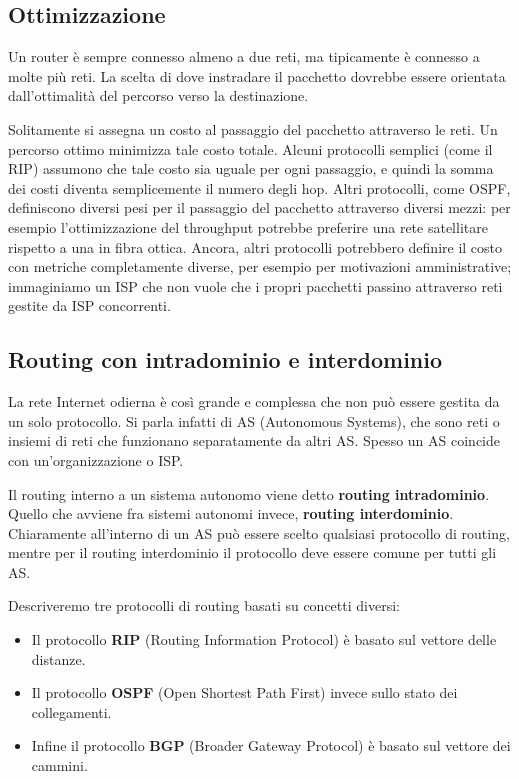     \subsection{Ottimizzazione}
        Un router è sempre connesso almeno a due reti, ma tipicamente è connesso a molte più reti. La scelta di dove instradare il pacchetto dovrebbe essere orientata dall'ottimalità del percorso verso la destinazione.
        
        Solitamente si assegna un costo al passaggio del pacchetto attraverso le reti. Un percorso ottimo minimizza tale costo totale. Alcuni protocolli semplici (come il RIP) assumono che tale costo sia uguale per ogni passaggio, e quindi la somma dei costi diventa semplicemente il numero degli hop. Altri protocolli, come OSPF, definiscono diversi pesi per il passaggio del pacchetto attraverso diversi mezzi: per esempio l'ottimizzazione del throughput potrebbe preferire una rete satellitare rispetto a una in fibra ottica. Ancora, altri protocolli potrebbero definire il costo con metriche completamente diverse, per esempio per motivazioni amministrative; immaginiamo un ISP che non vuole che i propri pacchetti passino attraverso reti gestite da ISP concorrenti.
        
    \subsection{Routing con intradominio e interdominio}
        La rete Internet odierna è così grande e complessa che non può essere gestita da un solo protocollo. Si parla infatti di AS (Autonomous Systems), che sono reti o insiemi di reti che funzionano separatamente da altri AS. Spesso un AS coincide con un'organizzazione o ISP.
        
        Il routing interno a un sistema autonomo viene detto \textbf{routing intradominio}. Quello che avviene fra sistemi autonomi invece, \textbf{routing interdominio}. Chiaramente all'interno di un AS può essere scelto qualsiasi protocollo di routing, mentre per il routing interdominio il protocollo deve essere comune per tutti gli AS.
        
        Descriveremo tre protocolli di routing basati su concetti diversi:
        \begin{itemize}
            \item Il protocollo \textbf{RIP} (Routing Information Protocol) è basato sul vettore delle distanze.
            
            \item Il protocollo \textbf{OSPF} (Open Shortest Path First) invece sullo stato dei collegamenti.
            
            \item Infine il protocollo \textbf{BGP} (Broader Gateway Protocol) è basato sul vettore dei cammini.
        \end{itemize}
        
